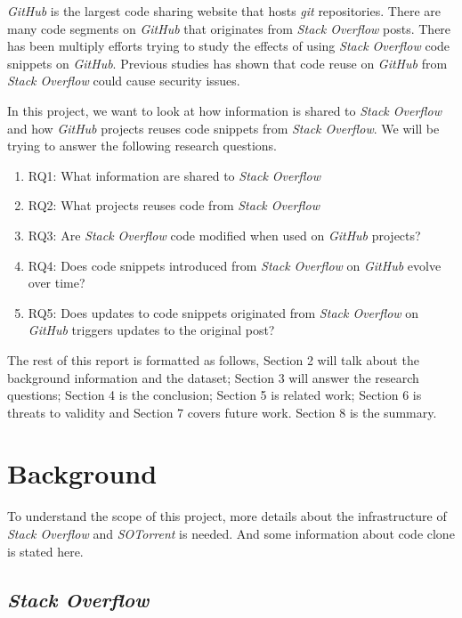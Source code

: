 \documentclass[sigconf]{acmart}
\begin{document}
\textit{GitHub} is the largest code sharing website that hosts \textit{git} repositories. There are many code segments on \textit{GitHub} that originates from \textit{Stack Overflow} posts. There has been multiply efforts trying to study the effects of using \textit{Stack Overflow} code snippets on \textit{GitHub}. Previous studies has shown that code reuse on \textit{GitHub} from \textit{Stack Overflow} could cause security issues. \cite{7958574} 

In this project, we want to look at how information is shared to \textit{Stack Overflow} and how \textit{GitHub} projects reuses code snippets from \textit{Stack Overflow}. We will be trying to answer the following research questions.

\begin{enumerate}
	\item RQ1: What information are shared to \textit{Stack Overflow}
	\item RQ2: What projects reuses code from \textit{Stack Overflow}
	\item RQ3: Are \textit{Stack Overflow} code modified when used on \textit{GitHub} projects?
	\item RQ4: Does code snippets introduced from \textit{Stack Overflow} on \textit{GitHub} evolve over time?
	\item RQ5: Does updates to code snippets originated from \textit{Stack Overflow} on \textit{GitHub} triggers updates to the original post?
\end{enumerate}

The rest of this report is formatted as follows, Section 2 will talk about the background information and the dataset; Section 3 will answer the research questions; Section 4 is the conclusion; Section 5 is related work; Section 6 is threats to validity and Section 7 covers future work. Section 8 is the summary. 

\section{Background}
To understand the scope of this project, more details about the infrastructure of \textit{Stack Overflow} and \textit{SOTorrent} is needed. And some information about code clone is stated here.

\subsection{\textit{Stack Overflow}}
\end{document}

